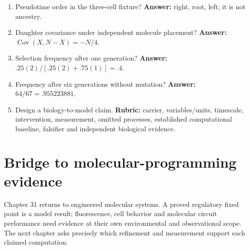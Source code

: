 \begin{enumerate}
\item Pseudotime order in the three-cell fixture? \textbf{Answer:} right, root, left; it is not ancestry.
\item Daughter covariance under independent molecule placement? \textbf{Answer:} $\operatorname{Cov}(X,N-X)=-N/4$.
\item Selection frequency after one generation? \textbf{Answer:} $.25(2)/[.25(2)+.75(1)]=.4$.
\item Frequency after six generations without mutation? \textbf{Answer:} $64/67=.955223881$.
\item Design a biology-to-model claim. \textbf{Rubric:} carrier, variables/units,
timescale, intervention, measurement, omitted processes, established computational
baseline, falsifier and independent biological evidence.
\end{enumerate}

\section{Bridge to molecular-programming evidence}
Chapter 31 returns to engineered molecular systems. A proved regulatory fixed
point is a model result; fluorescence, cell behavior and molecular circuit performance
need evidence at their own environmental and observational scope. The next chapter
asks precisely which refinement and measurement support each claimed computation.

